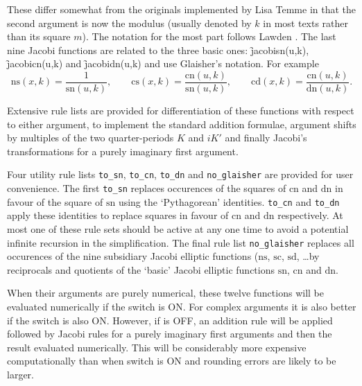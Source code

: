 These differ somewhat from the originals implemented by Lisa Temme in that
the second argument is now the modulus (usually denoted by $k$ in most texts
rather than its square $m$).  The notation for the most part follows  Lawden
\cite{Lawden:89}. The last nine Jacobi functions are related to the three
basic ones: \f{jacobisn(u,k)}, \f{jacobicn(u,k)} and \f{jacobidn(u,k)} and
use Glaisher's notation. For example
\[ \mathrm{ns}(x,k) = \frac{1}{\mathrm{sn}(u,k)}, \qquad
\mathrm{cs}(x,k) = \frac{\mathrm{cn}(u,k)}{\mathrm{sn}(u,k)}, \qquad
\mathrm{cd}(x,k) = \frac{\mathrm{cn}(u,k)}{\mathrm{dn}(u,k)}. \]

Extensive rule lists are provided for differentiation of these functions with
respect to either argument, to implement the standard addition formulae,
argument shifts by multiples of the two quarter-periods $K$ and $iK'$ and
finally Jacobi's transformations for a purely imaginary first argument.

\hypertarget{reserved:TO_SN}{}
\hypertarget{reserved:TO_CN}{}
\hypertarget{reserved:TO_DN}{}
\hypertarget{reserved:NO_GLAISHER}{}
Four utility rule lists \texttt{to\_sn}, \texttt{to\_cn}, \texttt{to\_dn} and
\texttt{no\_glaisher} are provided for user convenience. The first
\texttt{to\_sn} replaces occurences of the squares of $\mathrm{cn}$ and
$\mathrm{dn}$ in favour of the square of $\mathrm{sn}$ using the
`Pythagorean' identities. \texttt{to\_cn} and \texttt{to\_dn} apply these
identities to replace squares in favour of $\mathrm{cn}$ and $\mathrm{dn}$
respectively. At most one of these rule sets should be active at any one time
to avoid a potential infinite recursion in the simplification.
The final rule list \texttt{no\_glaisher} replaces all occurences of the
nine subsidiary Jacobi elliptic functions ($\mathrm{ns}$, $\mathrm{sc}$,
$\mathrm{sd}$, \ldots by reciprocals and quotients of the `basic' Jacobi
elliptic functions $\mathrm{sn}$, $\mathrm{cn}$ and $\mathrm{dn}$.

When their arguments are purely numerical, these twelve functions will be
evaluated numerically if the  switch is ON. For
complex arguments it is also better if the  switch is also ON.
However, if  is OFF, an addition rule will be applied followed by
Jacobi rules for a purely imaginary first arguments and then the result
evaluated numerically. This will be considerably more expensive computationally
than when switch  is ON and rounding errors are likely to be larger.

